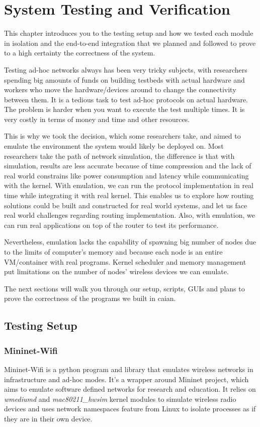 \chapter{System Testing and Verification}
\label{ch:system-testing}

This chapter introduces you to the testing setup and how we tested each module in isolation and the end-to-end integration that we planned and followed to prove to a high certainty the correctness of the system.

Testing ad-hoc networks always has been very tricky subjects, with researchers spending big amounts of funds on building testbeds with actual hardware and workers who move the hardware/devices around to change the connectivity between them.
It is a tedious task to test ad-hoc protocols on actual hardware.
The problem is harder when you want to execute the test multiple times.
It is very costly in terms of money and time and other resources.

This is why we took the decision, which some researchers take, and aimed to emulate the environment the system would likely be deployed on.
Most researchers take the path of network simulation, the difference is that with simulation, results are less accurate because of time compression and the lack of real world constrains like power consumption and latency while communicating with the kernel.
With emulation, we can run the protocol implementation in real time while integrating it with real kernel.
This enables us to explore how routing solutions could be built and constructed for real world systems, and let us face real world challenges regarding routing implementation.
Also, with emulation, we can run real applications on top of the router to test its performance.

Nevertheless, emulation lacks the capability of spawning big number of nodes due to the limits of computer's memory and because each node is an entire VM/container with real programs.
Kernel scheduler and memory management put limitations on the number of nodes' wireless devices we can emulate.

The next sections will walk you through our setup, scripts, GUIs and plans to prove the correctness of the programs we built in \acrshort{caian}.

\section{Testing Setup}
\subsection{Mininet-Wifi}
Mininet-Wifi is a python program and library that emulates wireless networks in infrastructure and ad-hoc modes.
It's a wrapper around Mininet project, which aims to emulate software defined networks for research and education.
It relies on \textit{wmediumd} and \textit{mac80211\_hwsim} kernel modules to simulate wireless radio devices and uses network namespaces feature from Linux to isolate processes as if they are in their own device.

